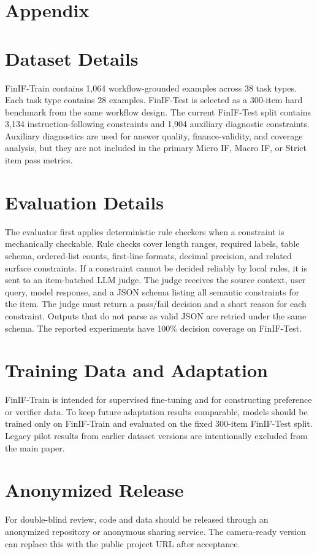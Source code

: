 \clearpage
\appendix
\section*{Appendix}

\section{Dataset Details}
\label{appendix:dataset}

FinIF-Train contains 1,064 workflow-grounded examples across 38 task types.
Each task type contains 28 examples.
FinIF-Test is selected as a 300-item hard benchmark from the same workflow design.
The current FinIF-Test split contains 3,134 instruction-following constraints and 1,904 auxiliary diagnostic constraints.
Auxiliary diagnostics are used for answer quality, finance-validity, and coverage analysis, but they are not included in the primary Micro IF, Macro IF, or Strict item pass metrics.

\section{Evaluation Details}
\label{appendix:evaluation}

The evaluator first applies deterministic rule checkers when a constraint is mechanically checkable.
Rule checks cover length ranges, required labels, table schema, ordered-list counts, first-line formats, decimal precision, and related surface constraints.
If a constraint cannot be decided reliably by local rules, it is sent to an item-batched LLM judge.
The judge receives the source context, user query, model response, and a JSON schema listing all semantic constraints for the item.
The judge must return a pass/fail decision and a short reason for each constraint.
Outputs that do not parse as valid JSON are retried under the same schema.
The reported experiments have 100\% decision coverage on FinIF-Test.

\section{Training Data and Adaptation}
\label{appendix:sft}

FinIF-Train is intended for supervised fine-tuning and for constructing preference or verifier data.
To keep future adaptation results comparable, models should be trained only on FinIF-Train and evaluated on the fixed 300-item FinIF-Test split.
Legacy pilot results from earlier dataset versions are intentionally excluded from the main paper.

\section{Anonymized Release}
\label{appendix:release}

For double-blind review, code and data should be released through an anonymized repository or anonymous sharing service.
The camera-ready version can replace this with the public project URL after acceptance.
